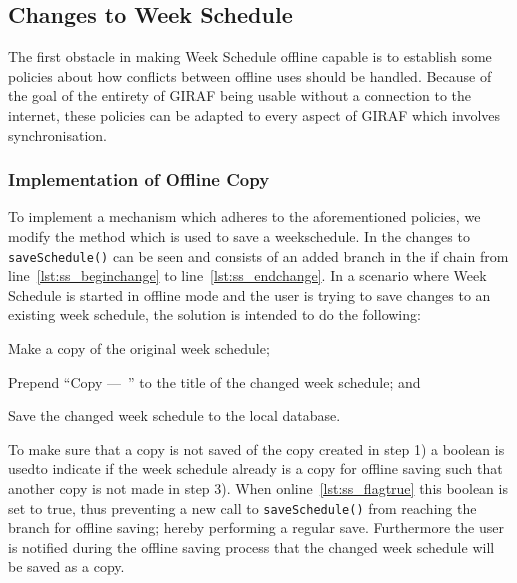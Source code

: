 \subsection{Changes to Week Schedule}
The first obstacle in making Week Schedule offline capable is to establish some policies about how conflicts between offline uses should be handled.
Because of the goal of the entirety of GIRAF being usable without a connection to the internet, these policies can be adapted to every aspect of GIRAF which involves synchronisation.


\subsubsection{Implementation of Offline Copy}
To implement a mechanism which adheres to the aforementioned policies, we modify the method which is used to save a weekschedule.
In  the changes to \texttt{saveSchedule()} can be seen and consists of an added branch in the if chain from line~\ref{lst:ss_beginchange} to line~\ref{lst:ss_endchange}.
In a scenario where Week Schedule is started in offline mode and the user is trying to save changes to an existing week schedule, the solution is intended to do the following: 
\begin{enumberate}
\item Make a copy of the original week schedule;
\item Prepend \enquote{Copy ---~} to the title of the changed week schedule; and
\item Save the changed week schedule to the local database.  
\end{enumberate}

To make sure that a copy is not saved of the copy created in step 1) a boolean is usedto indicate if the week schedule already is a copy for offline saving such that another copy is not made in step 3).
When online~\ref{lst:ss_flagtrue} this boolean is set to true, thus preventing a new call to \texttt{saveSchedule()} from reaching the branch for offline saving; hereby performing a regular save.
Furthermore the user is notified during the offline saving process that the changed week schedule will be saved as a copy.

